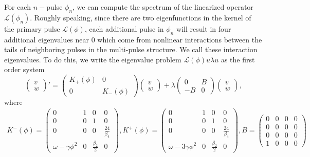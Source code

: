 \documentclass[12pt]{article}
\def\calL{{\mathcal L}}
\begin{document}
For each $n-$pulse $\phi_n$, we can compute the spectrum of the linearized operator $\calL(\phi_n)$. Roughly speaking, since there are two eigenfunctions in the kernel of the primary pulse $\calL(\phi)$, each additional pulse in $\phi_n$ will result in four additional eigenvalues near 0 which come from nonlinear interactions between the tails of neighboring pulses in the multi-pulse structure. We call these interaction eigenvalues. To do this, we write the eigenvalue problem $\calL(\phi)u \lambda u$ as the first order system
\begin{equation}
\begin{pmatrix}v \\ w\end{pmatrix}' =
\begin{pmatrix}K_+(\phi) & 0 \\ 0 & K_-(\phi) \end{pmatrix}
\begin{pmatrix}v \\ w\end{pmatrix}
+ \lambda \begin{pmatrix}0 & B \\ -B & 0\end{pmatrix}
\begin{pmatrix}v \\ w\end{pmatrix},
\end{equation}
where
\begin{align*}
K^-(\phi) = \begin{pmatrix}
0 & 1 & 0 & 0 \\
0 & 0 & 1 & 0 \\
0 & 0 & 0 & \frac{24}{\beta_4} \\
\omega - \gamma \phi^2 & 0 & \frac{\beta_2}{2} & 0
\end{pmatrix},
K^+(\phi) = \begin{pmatrix}
0 & 1 & 0 & 0 \\
0 & 0 & 1 & 0 \\
0 & 0 & 0 & \frac{24}{\beta_4} \\
\omega - 3 \gamma \phi^2 & 0 & \frac{\beta_2}{2} & 0
\end{pmatrix},
B = \begin{pmatrix}
0 & 0 & 0 & 0 \\
0 & 0 & 0 & 0 \\
0 & 0 & 0 & 0 \\
1 & 0 & 0 & 0
\end{pmatrix}
\end{align*}
\end{document}
